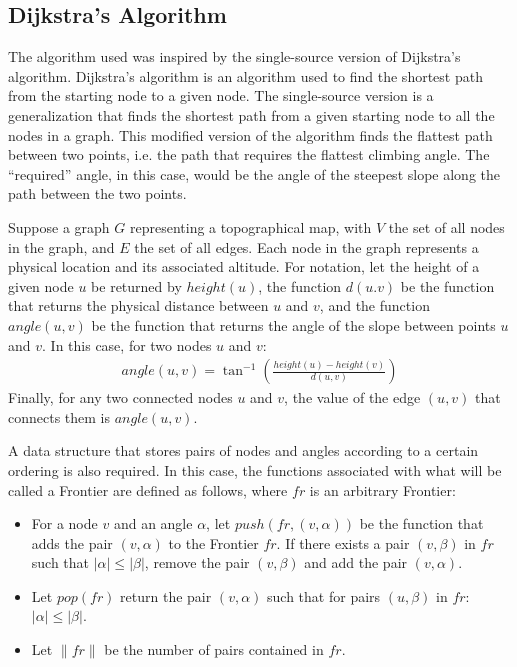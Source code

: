 \documentclass[12pt]{article}
\begin{document}
\subsection{Dijkstra's Algorithm}
\label{sub:the_algorithm}
\par The algorithm used was inspired by the single-source version of Dijkstra's algorithm. Dijkstra's algorithm is an algorithm used to find the shortest path from the starting node to a given node. The single-source version is a generalization that finds the shortest path from a given starting node to all the nodes in a graph. This modified version of the algorithm finds the flattest path between two points, i.e. the path that requires the flattest climbing angle. The ``required'' angle, in this case, would be the angle of the steepest slope along the path between the two points.
\par Suppose a graph $G$ representing a topographical map, with $V$ the set of all nodes in the graph, and $E$ the set of all edges. Each node in the graph represents a physical location and its associated altitude. For notation, let the height of a given node $u$ be returned by $height(u)$, the function $d(u.v)$ be the function that returns the physical distance between $u$ and $v$, and the function $angle(u,v)$ be the function that returns the angle of the slope between points $u$ and $v$. In this case, for two nodes $u$ and $v$:
\begin{align*}
  angle(u,v) = \tan^{-1}\left(\frac{height(u) - height(v)}{d(u,v)}\right)
\end{align*}
Finally, for any two connected nodes $u$ and $v$, the value of the edge $(u,v)$ that connects them is $angle(u,v)$.
\pagebreak
\par A data structure that stores pairs of nodes and angles according to a certain ordering is also required. In this case, the functions associated with what will be called a Frontier are defined as follows, where $fr$ is an arbitrary Frontier:
\begin{itemize}
  \item For a node $v$ and an angle $\alpha$, let $push(fr, (v,\alpha))$ be the function that adds the pair $(v, \alpha)$ to the Frontier $fr$. If there exists a pair $(v,\beta)$ in $fr$ such that $|\alpha| \leq |\beta|$, remove the pair $(v,\beta)$ and add the pair $(v,\alpha)$.
  \item Let $pop(fr)$ return the pair $(v, \alpha)$ such that for pairs $(u,\beta)$ in $fr$: $|\alpha| \leq |\beta|$.
  \item Let $\|fr\|$ be the number of pairs contained in $fr$.
\end{itemize}
\end{document}

